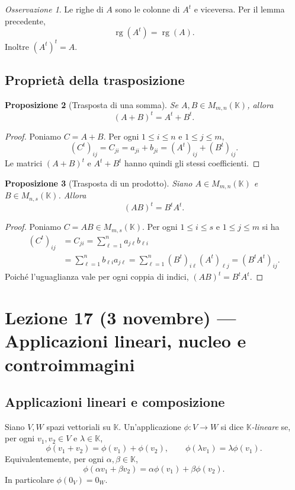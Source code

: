 \documentclass[11pt,a4paper]{article}
\newcommand{\KK}{\mathbb{K}}
\theoremstyle{plain}
\newtheorem{prop}{Proposizione}[section]
\theoremstyle{definition}
\theoremstyle{remark}
\newtheorem{oss}[prop]{Osservazione}
\begin{document}
\begin{oss}
Le righe di $A$ sono le colonne di $A^t$ e viceversa. Per il lemma precedente,
\[
 \operatorname{rg}(A^t)=\operatorname{rg}(A).
\]
Inoltre $(A^t)^t=A$.
\end{oss}

\subsection{Propriet\`a della trasposizione}

\begin{prop}[Trasposta di una somma]
Se $A,B\in M_{m,n}(\KK)$, allora
\[
 (A+B)^t=A^t+B^t.
\]
\end{prop}
\begin{proof}
Poniamo $C=A+B$. Per ogni $1\leq i\leq n$ e $1\leq j\leq m$,
\[
 (C^t)_{ij}=C_{ji}=a_{ji}+b_{ji}=(A^t)_{ij}+(B^t)_{ij}.
\]
Le matrici $(A+B)^t$ e $A^t+B^t$ hanno quindi gli stessi coefficienti.
\end{proof}

\begin{prop}[Trasposta di un prodotto]
Siano $A\in M_{m,n}(\KK)$ e $B\in M_{n,s}(\KK)$. Allora
\[
 (AB)^t=B^tA^t.
\]
\end{prop}
\begin{proof}
Poniamo $C=AB\in M_{m,s}(\KK)$. Per ogni $1\leq i\leq s$ e $1\leq j\leq m$ si ha
\[
 \begin{aligned}
 (C^t)_{ij}
 &=C_{ji}=\sum_{\ell=1}^{n}a_{j\ell}b_{\ell i}\\
 &=\sum_{\ell=1}^{n}b_{\ell i}a_{j\ell}
 =\sum_{\ell=1}^{n}(B^t)_{i\ell}(A^t)_{\ell j}
 =(B^tA^t)_{ij}.
 \end{aligned}
\]
Poich\'e l'uguaglianza vale per ogni coppia di indici, $(AB)^t=B^tA^t$.
\end{proof}


\section{Lezione 17 (3 novembre) --- Applicazioni lineari, nucleo e controimmagini}

\subsection{Applicazioni lineari e composizione}

Siano $V,W$ spazi vettoriali su $\KK$. Un'applicazione $\phi:V\to W$ si dice
\emph{$\KK$-lineare} se, per ogni $v_1,v_2\in V$ e $\lambda\in\KK$,
\[
 \phi(v_1+v_2)=\phi(v_1)+\phi(v_2),\qquad
 \phi(\lambda v_1)=\lambda\phi(v_1).
\]
Equivalentemente, per ogni $\alpha,\beta\in\KK$,
\[
 \phi(\alpha v_1+\beta v_2)=\alpha\phi(v_1)+\beta\phi(v_2).
\]
In particolare $\phi(0_V)=0_W$.
\end{document}
